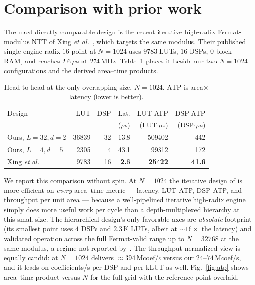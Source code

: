 \documentclass[conference]{IEEEtran}
\begin{document}
\section{Comparison with prior work}\label{sec:compare}
The most directly comparable design is the recent iterative high-radix
Fermat-modulus NTT of Xing \emph{et al.}~\cite{xing2025}, which targets the same
modulus. Their published single-engine radix-16 point at $N=1024$ uses
$9783$ LUTs, $16$ DSPs, $0$ block-RAM, and reaches $2.6\,\mu$s at $274$\,MHz.
Table~\ref{tab:compare} places it beside our two $N=1024$ configurations and the
derived area--time products.

\begin{table}[t]
\centering
\caption{Head-to-head at the only overlapping size, $N=1024$. ATP is
area$\times$latency (lower is better).}
\label{tab:compare}
\footnotesize
\setlength{\tabcolsep}{3pt}
\begin{tabular}{lrrrrr}
\toprule
Design & LUT & DSP & Lat. & LUT-ATP & DSP-ATP\\
       &     &     & ($\mu$s) & (LUT$\cdot\mu$s) & (DSP$\cdot\mu$s)\\
\midrule
Ours, $L{=}32,d{=}2$ & \num{36839} & 32 & 13.8 & \num{509402} & 442\\
Ours, $L{=}4,d{=}5$  & \num{2305}  & 4  & 43.1 & \num{99312}  & 172\\
Xing \emph{et al.}~\cite{xing2025} & \num{9783} & 16 & \textbf{2.6} & \textbf{\num{25422}} & \textbf{41.6}\\
\bottomrule
\end{tabular}
\end{table}

We report this comparison without spin. At $N=1024$ the iterative design of
\cite{xing2025} is more efficient on \emph{every} area--time metric --- latency,
LUT-ATP, DSP-ATP, and throughput per unit area --- because a well-pipelined
iterative high-radix engine simply does more useful work per cycle than a
depth-multiplexed hierarchy at this small size. The hierarchical design's only
favorable axes are \emph{absolute} footprint (its smallest point uses $4$ DSPs
and $2.3$\,K LUTs, albeit at $\sim\!16\times$ the latency) and validated operation
across the full Fermat-valid range up to $N=32768$ at the same modulus, a regime
not reported by~\cite{xing2025}. The throughput-normalized view is equally
candid: at $N=1024$ \cite{xing2025} delivers $\approx394$\,Mcoef/s versus our
$24$--$74$\,Mcoef/s, and it leads on coefficients/s-per-DSP and per-kLUT as well.
Fig.~\ref{fig:atp} shows area--time product versus $N$ for the full grid with the
reference point overlaid.
\end{document}
